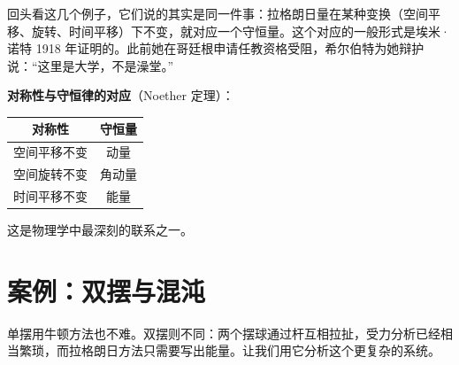 回头看这几个例子，它们说的其实是同一件事：拉格朗日量在某种变换（空间平移、旋转、时间平移）下不变，就对应一个守恒量。这个对应的一般形式是埃米·诺特 1918 年证明的。此前她在哥廷根申请任教资格受阻，希尔伯特为她辩护说：“这里是大学，不是澡堂。”


\begin{physicalmeaning}
\textbf{对称性与守恒律的对应}（Noether 定理）：

\begin{center}
\begin{tabular}{c|c}
\toprule
\textbf{对称性} & \textbf{守恒量} \\
\midrule
空间平移不变 & 动量 \\
空间旋转不变 & 角动量 \\
时间平移不变 & 能量 \\
\bottomrule
\end{tabular}
\end{center}

这是物理学中最深刻的联系之一。
\end{physicalmeaning}

\section{案例：双摆与混沌}

单摆用牛顿方法也不难。双摆则不同：两个摆球通过杆互相拉扯，受力分析已经相当繁琐，而拉格朗日方法只需要写出能量。让我们用它分析这个更复杂的系统。

